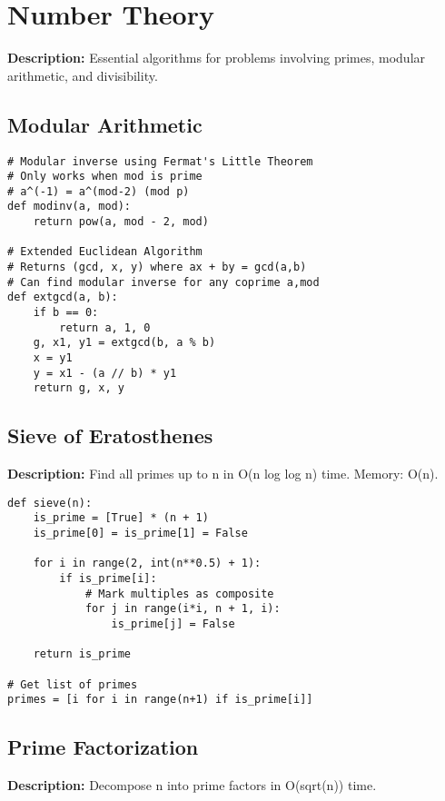 \section{Number Theory}

\textbf{Description:} Essential algorithms for problems involving primes, modular arithmetic, and divisibility.

\subsection{Modular Arithmetic}
\begin{lstlisting}
# Modular inverse using Fermat's Little Theorem
# Only works when mod is prime
# a^(-1) = a^(mod-2) (mod p)
def modinv(a, mod):
    return pow(a, mod - 2, mod)

# Extended Euclidean Algorithm
# Returns (gcd, x, y) where ax + by = gcd(a,b)
# Can find modular inverse for any coprime a,mod
def extgcd(a, b):
    if b == 0:
        return a, 1, 0
    g, x1, y1 = extgcd(b, a % b)
    x = y1
    y = x1 - (a // b) * y1
    return g, x, y
\end{lstlisting}

\subsection{Sieve of Eratosthenes}
\textbf{Description:} Find all primes up to n in O(n log log n) time. Memory: O(n).

\begin{lstlisting}
def sieve(n):
    is_prime = [True] * (n + 1)
    is_prime[0] = is_prime[1] = False
    
    for i in range(2, int(n**0.5) + 1):
        if is_prime[i]:
            # Mark multiples as composite
            for j in range(i*i, n + 1, i):
                is_prime[j] = False
    
    return is_prime

# Get list of primes
primes = [i for i in range(n+1) if is_prime[i]]
\end{lstlisting}

\subsection{Prime Factorization}
\textbf{Description:} Decompose n into prime factors in O(sqrt(n)) time.

